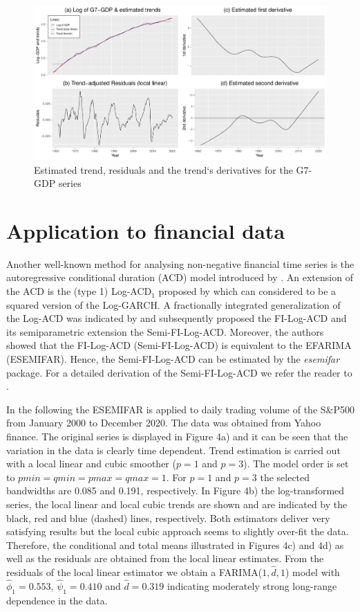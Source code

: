 \documentclass[12pt]{article}
\begin{document}
\begin{figure}[h!]
	\includegraphics[trim = {0cm 0mm 0mm 0mm}, width = \textwidth]{Abb/G7gdp.pdf}
	\caption{Estimated trend, residuals and the trend`s derivatives for the G7-GDP series}
\end{figure}


\section{Application to financial data}
 Another well-known method for analysing non-negative financial time series is the autoregressive conditional duration (ACD) model introduced by \citet{engle1998autoregressive}. An extension of the ACD is the (type 1) Log-ACD$_1$ proposed by \citet{bauwens2008moments} which can considered to be a squared version of the Log-GARCH. A fractionally integrated generalization of the Log-ACD was indicated by \citet{beran2015modelling} and subsequently \citet{feng2015forecasting} proposed the FI-Log-ACD and its semiparametric extension the Semi-FI-Log-ACD. Moreover, the authors showed that the FI-Log-ACD (Semi-FI-Log-ACD) is equivalent to the EFARIMA (ESEMIFAR). Hence, the Semi-FI-Log-ACD can be estimated by the \textit{esemifar} package. For a detailed derivation of the Semi-FI-Log-ACD we refer the reader to \citet{feng2015forecasting}.

 In the following the ESEMIFAR is applied to daily trading volume of the S\&P500 from January 2000 to December 2020. The data was obtained from Yahoo finance. The original series is displayed in Figure 4a) and it can be seen that the variation in the data is clearly time dependent. Trend estimation is carried out with a local linear and cubic smoother ($p = 1$ and $p = 3$). The model order is set to  $\textit{pmin} = \textit{qmin} = \textit{pmax} = \textit{qmax} = 1$. For $p=1$ and $p=3$ the selected bandwidths are 0.085 and 0.191, respectively. In Figure 4b) the log-transformed series, the local linear and local cubic trends are shown and are indicated by the black, red and blue (dashed) lines, respectively. Both estimators deliver very satisfying results but the local cubic approach seems to slightly over-fit the data. Therefore, the conditional and total means illustrated in Figures 4c) and 4d) as well as the residuals are obtained from the local linear estimates. From the residuals of the local linear estimator we obtain a FARIMA($1, \hat{d}, 1$) model with $\hat{\phi}_1 = 0.553$, $\hat{\psi}_1 = 0.410$ and $\hat{d} = 0.319$ indicating moderately strong long-range dependence in the data. 
 
\end{document}
